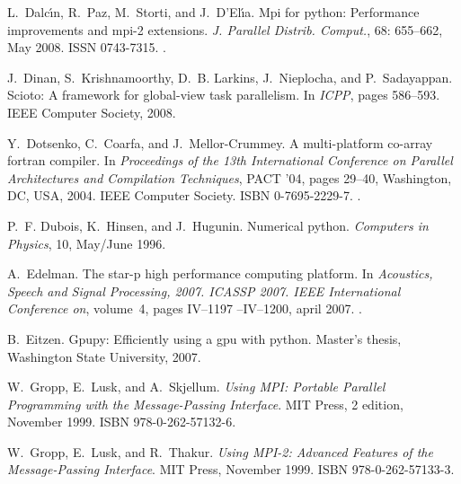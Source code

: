 \documentclass{sigplanconf}
\begin{document}
\begin{thebibliography}{35}
L.~Dalc\'{\i}n, R.~Paz, M.~Storti, and J.~D'El\'{\i}a.
\newblock Mpi for python: Performance improvements and mpi-2 extensions.
\newblock \emph{J. Parallel Distrib. Comput.}, 68: 655--662, May 2008.
\newblock ISSN 0743-7315.
\newblock {}.

J.~Dinan, S.~Krishnamoorthy, D.~B. Larkins, J.~Nieplocha, and P.~Sadayappan.
\newblock Scioto: A framework for global-view task parallelism.
\newblock In \emph{ICPP}, pages 586--593. IEEE Computer Society, 2008.

Y.~Dotsenko, C.~Coarfa, and J.~Mellor-Crummey.
\newblock A multi-platform co-array fortran compiler.
\newblock In \emph{Proceedings of the 13th International Conference on Parallel
  Architectures and Compilation Techniques}, PACT '04, pages 29--40,
  Washington, DC, USA, 2004. IEEE Computer Society.
\newblock ISBN 0-7695-2229-7.
\newblock {}.

P.~F. Dubois, K.~Hinsen, and J.~Hugunin.
\newblock Numerical python.
\newblock \emph{Computers in Physics}, 10, May/June 1996.

A.~Edelman.
\newblock The star-p high performance computing platform.
\newblock In \emph{Acoustics, Speech and Signal Processing, 2007. ICASSP 2007.
  IEEE International Conference on}, volume~4, pages IV--1197 --IV--1200, april
  2007.
\newblock {}.

B.~Eitzen.
\newblock Gpupy: Efficiently using a gpu with python.
\newblock Master's thesis, Washington State University, 2007.

W.~Gropp, E.~Lusk, and A.~Skjellum.
\newblock \emph{Using MPI: Portable Parallel Programming with the
  Message-Passing Interface}.
\newblock MIT Press, 2 edition, November 1999{}.
\newblock ISBN 978-0-262-57132-6.

W.~Gropp, E.~Lusk, and R.~Thakur.
\newblock \emph{Using MPI-2: Advanced Features of the Message-Passing
  Interface}.
\newblock MIT Press, November 1999{}.
\newblock ISBN 978-0-262-57133-3.


\end{thebibliography}
\end{document}
